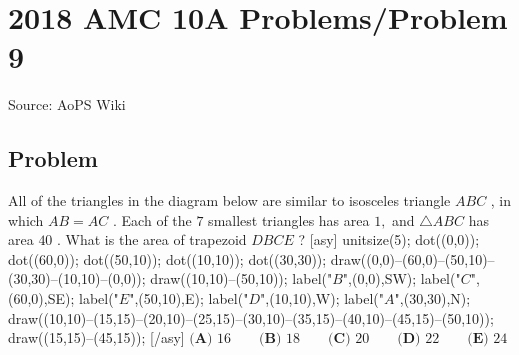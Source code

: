 \documentclass[12pt]{article}
\begin{document}
\section*{{2018 AMC 10A Problems/Problem 9}}
Source: AoPS Wiki

\subsection*{Problem}
All of the triangles in the diagram below are similar to isosceles triangle $ABC$ , in which $AB=AC$ . Each of the $7$ smallest triangles has area $1,$ and $\triangle ABC$ has area $40$ . What is the area of trapezoid $DBCE$ ? [asy] unitsize(5); dot((0,0)); dot((60,0)); dot((50,10)); dot((10,10)); dot((30,30)); draw((0,0)--(60,0)--(50,10)--(30,30)--(10,10)--(0,0)); draw((10,10)--(50,10)); label("$B$",(0,0),SW); label("$C$",(60,0),SE); label("$E$",(50,10),E); label("$D$",(10,10),W); label("$A$",(30,30),N); draw((10,10)--(15,15)--(20,10)--(25,15)--(30,10)--(35,15)--(40,10)--(45,15)--(50,10)); draw((15,15)--(45,15)); [/asy] $\textbf{(A) } 16 \qquad \textbf{(B) } 18 \qquad \textbf{(C) } 20 \qquad \textbf{(D) } 22 \qquad \textbf{(E) } 24$
\end{document}
